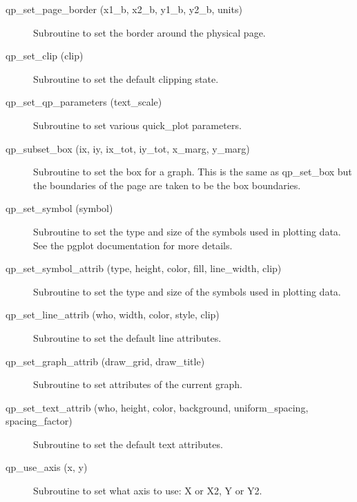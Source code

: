 \begin{description}
\item[qp_set_page_border (x1_b, x2_b, y1_b, y2_b, units)] \Newline 
     Subroutine to set the border around the physical page.

\item[qp_set_clip (clip)] \Newline 
     Subroutine to set the default clipping state.

\item[qp_set_qp_parameters (text_scale)] \Newline 
Subroutine to set various quick_plot parameters.

\item[qp_subset_box (ix, iy, ix_tot, iy_tot, x_marg, y_marg)] \Newline 
     Subroutine to set the box for a graph. This is the same as
     qp_set_box but the boundaries of the page are taken to be the box boundaries.

\item[qp_set_symbol (symbol)] \Newline 
     Subroutine to set the type and size of the symbols used in plotting data.
     See the pgplot documentation for more details.

\item[qp_set_symbol_attrib (type, height, color, fill, line_width, clip)] \Newline 
     Subroutine to set the type and size of the symbols used in plotting data.

\item[qp_set_line_attrib (who, width, color, style, clip)] \Newline 
     Subroutine to set the default line attributes.

\item[qp_set_graph_attrib (draw_grid, draw_title)] \Newline 
     Subroutine to set attributes of the current graph.

\item[qp_set_text_attrib (who, height, color, background, 
                                uniform_spacing, spacing_factor) ] \Newline 
     Subroutine to set the default text attributes.

\item[qp_use_axis (x, y)] \Newline 
Subroutine to set what axis to use: X or X2, Y or Y2.

\end{description}

